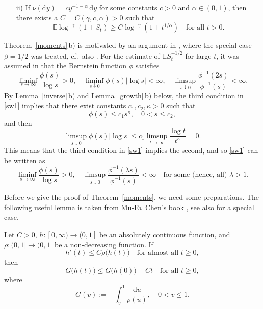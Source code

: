 \documentclass{aptpub}
\newcommand\EE{\mathds E}
\newcommand\dup{\mathrm{d}}
\numberwithin{equation}{section}
\begin{document}
\begin{thm}
\begin{enumerate}
\begin{enumerate}
        \item[\upshape ii)]
            If $\nu(\dup y)= cy^{-1-\alpha}\,\dup y$ for some constants $c>0$ and $\alpha\in(0,1)$, then there exists a $C=C(\gamma,c,\alpha)>0$ such that
            $$
                \EE\log^{-\gamma}(1+S_t)
                \geq C\log^{-\gamma}\left(1+t^{1/\alpha}\right)
                \quad \text{for all $t>0$}.
            $$
        \end{enumerate}
        \end{enumerate}
\end{thm}


\begin{rem}\label{momrem}
    Theorem~\ref{moments}\,b) is motivated by an argument in \cite[proof of Theorem 2.1]{BSW11}, where the special case $\beta=1/2$ was treated, cf.\ also \cite[proof of Theorem 1.3]{SSW12}. For the estimate of $\EE S_t^{-1/2}$ for large $t$, it was assumed in \cite[Theorem 2.1]{BSW11} that the Bernstein function $\phi$ satisfies
    \begin{equation}\label{sw1}
        \liminf_{s\to\infty}\frac{\phi(s)}{\log s}>0,
            \quad
        \liminf_{s\downarrow0}\phi(s)|\log s|<\infty,
            \quad
        \limsup_{s\downarrow0}\frac{\phi^{-1}(2s)}{\phi^{-1}(s)}<\infty.
    \end{equation}
    By Lemma~\ref{inverse}\,b) and Lemma~\ref{growth}\,b) below, the third condition in \eqref{sw1} implies that there exist constants $c_1,c_2,\kappa>0$ such that
    $$
        \phi(s)\leq c_1s^\kappa,\quad 0<s\leq c_2,
    $$
    and then
    $$
        \limsup_{s\downarrow0}\phi(s)|\log s|
        \leq
        c_1\limsup_{t\to\infty} \frac{\log t}{t^\kappa}=0.
    $$
    This means that the third condition in \eqref{sw1} implies the second, %
    and so \eqref{sw1} can be written as
    $$
        \liminf_{s\to\infty}\frac{\phi(s)}{\log s}>0,
            \quad
        \limsup_{s\downarrow0}\frac{\phi^{-1}(\lambda s)}{\phi^{-1}(s)}<\infty
            \quad\text{for some (hence, all) $\lambda>1$}.
    $$
\end{rem}


Before we give the proof of Theorem~\ref{moments}, we need some preparations. The following useful lemma is taken from Mu-Fa\ Chen's book \cite[Lemma A.1, p.~193]{Chen05}, see also  \cite[Lemma 5]{SW12} for a special case.

\begin{lem}\label{asdf}
    Let $C>0$, $h:[0,\infty)\to(0,1]$ be an absolutely continuous function, and $\rho:(0,1]\to(0,1]$ be a non-decreasing function. If
    $$
        h'(t)\leq C\rho\big(h(t)\big)
        \quad \text{for almost all $t\geq0$},
    $$
    then
    $$
        G\big(h(t)\big)\leq G\big(h(0)\big)-Ct
        \quad \text{for all $t\geq0$},
    $$
    where
    $$
        G(v):=-\int_v^1\frac{\dup u}{\rho(u)},\quad 0<v\leq 1.
    $$
\end{lem}
\end{document}
